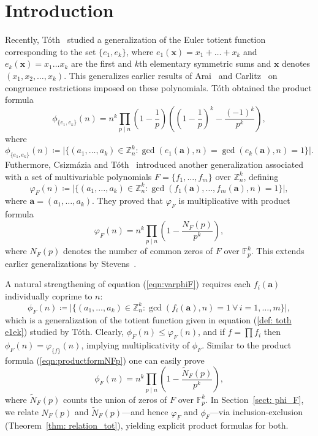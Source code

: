 \documentclass[12pt]{article}
\begin{document}
\section{Introduction}
Recently, T\'oth~\cite{toth2022another} studied a generalization of the Euler totient function corresponding to the set $\{e_1, e_k\}$, where $e_1(\mathbf{x}) = x_1+\dots+x_k$ and $e_k(\mathbf{x}) = x_1\dots x_k$ are the first and $k$th elementary symmetric sums and $\mathbf{x}$ denotes $(x_1,x_2,\dots, x_k)$. This generalizes earlier results of Arai~\cite{arai1961e1460} and Carlitz~\cite[Solution to problem E1460]{carlitz1961solution} on congruence restrictions imposed on these polynomials. T\'oth obtained the product formula
\[
\phi_{\{e_1,e_k\}}(n) = n^k \prod_{p \mid n} \left(1 - \frac{1}{p}\right) \left(\left(1-\frac{1}{p}\right)^k - \frac{(-1)^k}{p^k}\right),
\]
where
\begin{equation}\label{def: toth e1ek}
\phi_{\{e_1,e_k\}}(n) \coloneqq \bigl|\{(a_1, \dots, a_k) \in \mathbb{Z}_n^k : \gcd(e_1(\mathbf{a}), n)=\gcd(e_k(\mathbf{a}),n) = 1 \}\bigr|.    
\end{equation}
Futhermore, Csizm\'azia and T\'oth~\cite{csizmazia2025generalizationseulersvarphifunctionrespect} introduced another generalization associated with a set of multivariable polynomials $F = \{f_1, \dots, f_m\}$ over $\mathbb{Z}_n^k$, defining
\begin{equation}\label{eqn:varphiF}
\varphi_F(n) \coloneqq \bigl|\{(a_1, \dots, a_k) \in \mathbb{Z}_n^k : \gcd(f_1(\mathbf{a}), \dots, f_m(\mathbf{a}), n) = 1 \}\bigr|,
\end{equation}
where $\mathbf{a} = (a_1, \dots, a_k)$. They proved that $\varphi_F$ is multiplicative with product formula~\cite[Theorem~2.1]{csizmazia2025generalizationseulersvarphifunctionrespect}
\begin{equation}\label{eqn:productformNFp}
\varphi_F(n)=n^k\prod_{p\mid n}\left(1-\frac{N_F(p)}{p^k}\right),
\end{equation}
where $N_F(p)$ denotes the number of common zeros of $F$ over $\mathbb{F}_p^k$. This extends earlier generalizations by  Stevens~\cite{stevens1971generalizations}.

A natural strengthening of equation (\ref{eqn:varphiF}) requires each $f_i(\mathbf{a})$ individually coprime to $n$:
\begin{equation}\label{eqn:phi}
\phi_F(n) \coloneqq \bigl|\{(a_1, \dots, a_k) \in \mathbb{Z}_n^k : \gcd(f_i(\mathbf{a}), n) = 1 \ \forall\, i=1,\dots,m \}\bigr|,
\end{equation}
which is a generalization of the totient function given in equation (\ref{def: toth e1ek}) studied by T\'{o}th.
Clearly, $\phi_F(n) \leq \varphi_F(n)$, and if $f = \prod f_i$ then $\phi_F(n) = \varphi_{\{f\}}(n)$, implying multiplicativity of $\phi_F$. Similar to the product formula (\ref{eqn:productformNFp}) one can easily prove 
\[
\phi_F(n)=n^k\prod_{p\mid n}\left(1-\frac{\widetilde{N}_F(p)}{p^k}\right),
\]
where $\widetilde{N}_F(p)$ counts the union of zeros of $F$ over $\mathbb{F}_p^k$. In Section~\ref{sect: phi_F}, we relate $N_F(p)$ and $\widetilde{N}_F(p)$---and hence $\varphi_F$ and $\phi_F$---via inclusion-exclusion (Theorem~\ref{thm: relation_tot}), yielding explicit product formulas for both. 
\end{document}

